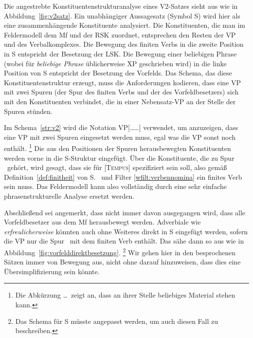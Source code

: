 
Die angestrebte Konstituentenstrukturanalyse eines V2-Satzes sieht aus wie in Abbildung~\ref{fig:v2satz}.
Ein unabhängiger Aussagesatz (Symbol S) wird hier als eine zusammenhängende Konstituente analysiert.
Die Konstituenten, die man im Feldermodell dem Mf und der RSK zuordnet, entsprechen den Resten der VP und des Verbalkomplexes.
Die Bewegung des finiten Verbs in die zweite Position in S entspricht der Besetzung der LSK.
Die Bewegung einer beliebigen Phrase (wobei für \textit{beliebige Phrase} üblicherweise XP geschrieben wird) in die linke Position von S entspricht der Besetzung des Vorfelds.
Das Schema, das diese Konstituentenstruktur erzeugt, muss die Anforderungen kodieren, dass eine VP mit zwei Spuren (der Spur des finiten Verbs und der des Vorfeldbesetzers) sich mit den Konstituenten verbindet, die in einer Nebensatz-VP an der Stelle der Spuren stünden.


Im Schema~\ref{str:v2} wird die Notation VP[\ldots\Ti\ldots\Tii] verwendet, um anzuzeigen, dass eine VP mit zwei Spuren eingesetzt werden muss, egal was die VP sonst noch enthält.%
\footnote{Die Abkürzung \ldots\ zeigt an, dass an ihrer Stelle beliebiges Material stehen kann.}
Die aus den Positionen der Spuren herausbewegten Konstituenten werden vorne in die S-Struktur eingefügt.
Über die Konstituente, die zu Spur \Ti\ gehört, wird gesagt, dass sie für [\textsc{Tempus}] spezifiziert sein soll, also gemäß Definition~\ref{def:finitheit} von S.~\pageref{def:finitheit} und Filter \ref{wfilt:verbennomina} ein finites Verb sein muss.
Das Feldermodell kann also vollständig durch eine sehr einfache phrasenstrukturelle Analyse ersetzt werden.

Abschließend sei angemerkt, dass nicht immer davon ausgegangen wird, dass alle Vorfeldbesetzer aus dem Mf herausbewegt werden.
Adverbiale wie \textit{erfreulicherweise} \zB könnten auch ohne Weiteres direkt in S eingefügt werden, sofern die VP nur die Spur \Ti\ mit dem finiten Verb enthält.
Das sähe dann so aus wie in Abbildung~\ref{fig:vorfelddirektbesetzung}.%
\footnote{Das Schema für S müsste angepasst werden, um auch diesen Fall zu beschreiben.}
Wir gehen hier in den besprochenen Sätzen immer von Bewegung aus, nicht ohne darauf hinzuweisen, dass dies eine Übersimplifizierung sein könnte.

